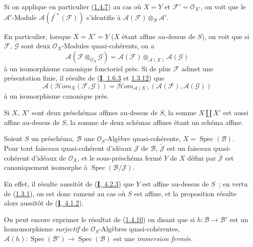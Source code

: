 Si on applique en particulier (\hyperref[II.1.4.7-fr]{1.4.7}) au cas où
$X=Y$ et $\mathcal{F}'=\mathcal{O}_{X'}$, on voit que le
$\mathcal{A}'$-Module $\mathcal{A}(f^{\prime*}(\mathcal{F}))$ s'identifie à
$\mathcal{A}(\mathcal{F})\otimes_{\mathcal{B}}\mathcal{A}'$.

\begin{env}[1.4.8]
\label{II.1.4.8-fr}
En particulier, lorsque $X=X'=Y$ ($X$ étant affine au-dessus de $S$), on voit
que si $\mathcal{F}$, $\mathcal{G}$ sont deux $\mathcal{O}_X$-Modules
quasi-cohérents, on a
\[
  \mathcal{A}(\mathcal{F}\otimes_{\mathcal{O}_X}\mathcal{G})
  =\mathcal{A}(\mathcal{F})\otimes_{\mathcal{A}(X)}\mathcal{A}(\mathcal{G})
  \tag{1.4.8.1}\label{II.1.4.8.1-fr}
\]
à un isomorphisme canonique fonctoriel près. Si de plus $\mathcal{F}$ admet
une présentation finie, il résulte de
(\hyperref[I.1.6.3-fr]{\textbf{I}, 1.6.3} et
\hyperref[I.1.3.12-fr]{1.3.12}) que
\[
  \mathcal{A}(\mathcal{H}om_X(\mathcal{F},\mathcal{G}))
  =\mathcal{H}om_{\mathcal{A}(X)}
    (\mathcal{A}(\mathcal{F}),\mathcal{A}(\mathcal{G}))
  \tag{1.4.8.2}\label{II.1.4.8.2-fr}
\]
à un isomorphisme canonique près.
\end{env}

\begin{remark}[1.4.9]
\label{II.1.4.9-fr}
Si $X$, $X'$ sont deux préschémas affines au-dessus de $S$, la somme
$X\amalg X'$ est aussi affine au-dessus de $S$, la somme de deux schémas
affines étant un schéma affine.
\end{remark}

\begin{proposition}[1.4.10]
\label{II.1.4.10-fr}
Soient $S$ un préschéma, $\mathcal{B}$ une $\mathcal{O}_S$-Algèbre
quasi-cohérente, $X=\operatorname{Spec}(\mathcal{B})$. Pour tout faisceau
quasi-cohérent d'idéaux $\mathcal{J}$ de $\mathcal{B}$,
$\widetilde{\mathcal{J}}$ est un faisceau quasi-cohérent d'idéaux de
$\mathcal{O}_X$, et le sous-préschéma fermé $Y$ de $X$ défini par
$\widetilde{\mathcal{J}}$ est canoniquement isomorphe à
$\operatorname{Spec}(\mathcal{B}/\mathcal{J})$.
\end{proposition}

En effet, il résulte aussitôt de (\hyperref[I.4.2.3-fr]{\textbf{I}, 4.2.3}) que $Y$
est affine au-dessus de $S$~; en vertu de
(\hyperref[II.1.3.1-fr]{1.3.1}), on est donc ramené au cas où $S$ est affine,
et la proposition résulte alors aussitôt de
(\hyperref[I.4.1.2-fr]{\textbf{I}, 4.1.2}).

On peut encore exprimer le résultat de
(\hyperref[II.1.4.10-fr]{1.4.10}) en disant que si
$h:\mathcal{B}\to\mathcal{B}'$ est un homomorphisme \emph{surjectif} de
$\mathcal{O}_S$-Algèbres quasi-cohérentes,
$\mathcal{A}(h):\operatorname{Spec}(\mathcal{B}')\to
\operatorname{Spec}(\mathcal{B})$ est une \emph{immersion fermée}.

